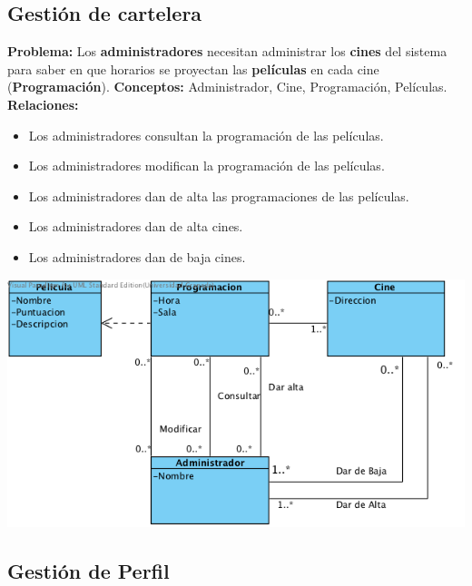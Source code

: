 \documentclass{article}
\begin{document}
	\subsection*{Gestión de cartelera}
	\textbf{Problema:} Los \textbf{administradores} necesitan administrar los \textbf{cines} del sistema para saber en que horarios se proyectan 
	las \textbf{películas} en cada cine (\textbf{Programación}).
	\textbf{Conceptos:} Administrador, Cine, Programación, Películas.\\
	\textbf{	Relaciones:}
		\begin{itemize}
			\item Los administradores consultan la programación de las películas.
			\item Los administradores modifican la programación de las películas.
			\item Los administradores dan de alta las programaciones de las películas.
			\item Los administradores dan de alta cines.
			\item Los administradores dan de baja cines.
		\end{itemize}
	\includegraphics[width=1\linewidth]{./C-Cartelera}
	
	
	\subsection*{Gestión de Perfil}



\end{document}
